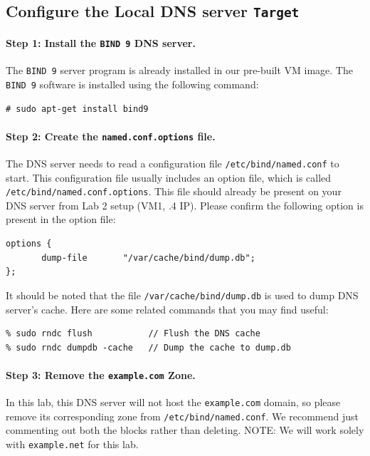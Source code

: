 

\subsection{Configure the Local DNS server {\tt Target}} 

\paragraph{Step 1: Install the {\tt BIND 9} DNS server.} 
The {\tt BIND 9} server program is already installed in our pre-built
\ubuntu VM image. The {\tt BIND 9} software is installed
using the following command:
\begin{verbatim}
# sudo apt-get install bind9
\end{verbatim}


\paragraph{Step 2: Create the {\tt named.conf.options} file.}
The DNS server needs to read a configuration file 
{\tt /etc/bind/named.conf} to start. This configuration file usually includes an option 
file, which is called {\tt /etc/bind/named.conf.options}. This file should already be present on your DNS server from Lab 2 setup (VM1, .4 IP).   Please confirm the following option is present in the option file: 
\begin{verbatim}
options {
       dump-file       "/var/cache/bind/dump.db";
};
\end{verbatim}

It should be noted that the file \texttt{/var/cache/bind/dump.db} 
is used to dump DNS server's cache. Here are some related commands 
that you may find useful:
\begin{verbatim}
% sudo rndc flush         	// Flush the DNS cache
% sudo rndc dumpdb -cache 	// Dump the cache to dump.db  
\end{verbatim}

\paragraph{Step 3: Remove the {\tt example.com} Zone.}
In this lab, this DNS server will not host the {\tt example.com} domain, so please remove its
corresponding zone from {\tt /etc/bind/named.conf}. We recommend just commenting out both the blocks rather than deleting. NOTE: We will work solely with {\tt example.net} for this lab. 

